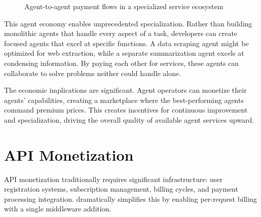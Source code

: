 \begin{figure}[htbp]
\centering
{}
\caption{Agent-to-agent payment flows in a specialized service ecosystem}
\label{fig:a2a-economy}
\end{figure}

This agent economy enables unprecedented specialization. Rather than building monolithic agents that handle every aspect of a task, developers can create focused agents that excel at specific functions. A data scraping agent might be optimized for web extraction, while a separate summarization agent excels at condensing information. By paying each other for services, these agents can collaborate to solve problems neither could handle alone.

The economic implications are significant. Agent operators can monetize their agents' capabilities, creating a marketplace where the best-performing agents command premium prices. This creates incentives for continuous improvement and specialization, driving the overall quality of available agent services upward.

\section{API Monetization}
\label{sec:api-monetization}

API monetization traditionally requires significant infrastructure: user registration systems, subscription management, billing cycles, and payment processing integration. \tprotocol{} dramatically simplifies this by enabling per-request billing with a single middleware addition.


